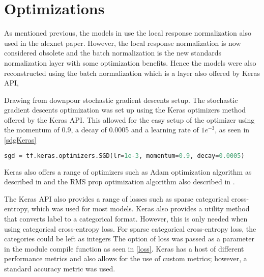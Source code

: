 \section{Optimizations}

As mentioned previous, the models in \citep{KarpathyCVPR14} use the local response normalization \cite{ROBINSON20071631} also used in the alexnet paper\cite{NIPS2012_4824}. However, the  local response normalization is now considered obsolete and the batch normalization \cite{ioffe2015batch} is the new standards normalization layer with some optimization benefits. Hence the models were also reconstructed using the batch normalization which is a layer also offered by Keras API,

Drawing from \citep{KarpathyCVPR14} downpour stochastic gradient descents setup. The stochastic gradient descents optimization was set up using the Keras optimizers method offered by the Keras API. This allowed for the easy setup of the optimizer using the momentum of 0.9, a decay of 0.0005 and a learning rate of $1e^{-3}$, as seen in \ref{sdgKeras}

\begin{lstlisting}[language=Python, caption=Keras SGD optimization, label=sdgKeras]
    sgd = tf.keras.optimizers.SGD(lr=1e-3, momentum=0.9, decay=0.0005)
\end{lstlisting}


Keras also offers a range of optimizers such as Adam optimization algorithm as described in \citep{kingma2014adam} \citep{ruder2016overview} and the RMS prop optimization algorithm also described in \citep{ruder2016overview}.

The Keras API also provides a range of losses such as sparse categorical cross-entropy, which was used for most models.  Keras also provides a utility method that converts label to a categorical format. However, this is only needed when using categorical cross-entropy loss. For sparse categorical cross-entropy loss, the categories could be left as integers  The option of loss was passed as a parameter in the module compile function as seen in \ref{loss}. Keras has a host of different performance metrics and also allows for the use of custom metrics; however, a standard accuracy metric was used. 

